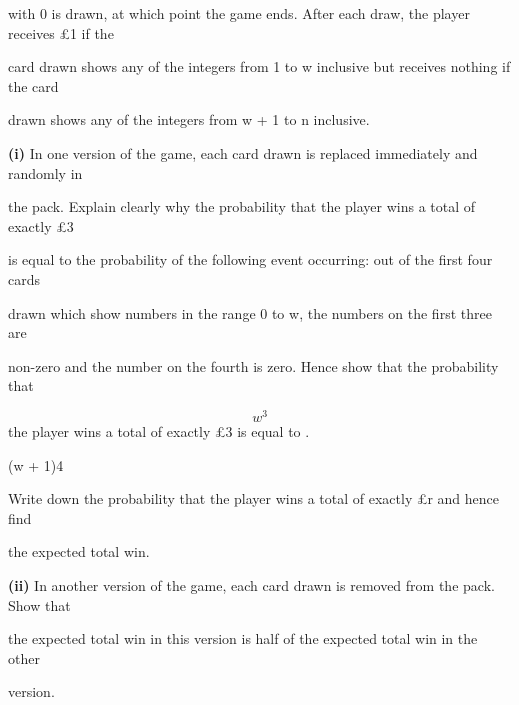 \documentclass[12pt]{article}
\begin{document}
\begin{flushleft}
with 0 is drawn, at which point the game ends. After each draw, the player receives \pounds 1 if the\par
card drawn shows any of the integers from 1 to w inclusive but receives nothing if the card\par
drawn shows any of the integers from w + 1 to n inclusive.\par
\textbf{(i)} In one version of the game, each card drawn is replaced immediately and randomly in\par
the pack. Explain clearly why the probability that the player wins a total of exactly \pounds 3\par
is equal to the probability of the following event occurring: out of the first four cards\par
drawn which show numbers in the range 0 to w, the numbers on the first three are\par
non-zero and the number on the fourth is zero. Hence show that the probability that\par
\[w^3\]
the player wins a total of exactly \pounds 3 is equal to .\par
(w + 1)4\par
Write down the probability that the player wins a total of exactly \pounds r and hence find\par
the expected total win.\par
\textbf{(ii)} In another version of the game, each card drawn is removed from the pack. Show that\par
the expected total win in this version is half of the expected total win in the other\par
version.\par
\end{flushleft}
\end{document}
